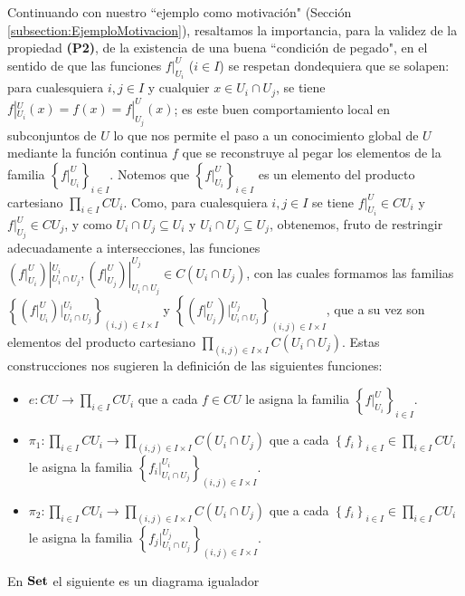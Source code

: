 Continuando con nuestro ``ejemplo como motivación" (Sección \ref{subsection:EjemploMotivacion}), resaltamos la importancia, para la validez de la propiedad \textbf{(P2)}, de la existencia de una buena ``condición de pegado", en el sentido de que las funciones $f|^{U}_{U_i}$ ($i\in I$) se respetan dondequiera que se solapen: para cualesquiera $i,j\in I$ y cualquier $x\in U_i\cap U_j$, se tiene $f|^U_{U_i}(x)=f(x)=f|^U_{U_j}(x)$; es este buen comportamiento local en subconjuntos de $U$ lo que nos permite el paso a un conocimiento global de $U$ mediante la función continua $f$ que se reconstruye al pegar los elementos de la familia $\left\lbrace f|^U_{U_i}\right\rbrace_{i\in I}$. Notemos que $\left\lbrace f|^U_{U_i}\right\rbrace_{i\in I}$ es un elemento del producto cartesiano $\prod_{i\in I} CU_i$. Como, para cualesquiera $i,j\in I$ se tiene $f|^U_{U_i}\in CU_i$ y $f|^U_{U_j}\in CU_j$, y como $U_i\cap U_j\subseteq U_i$ y $U_i\cap U_j\subseteq U_j$, obtenemos, fruto de restringir adecuadamente a intersecciones, las funciones $({f|^U_{U_i}})|^{U_i}_{U_i\cap U_j}, ({f|^U_{U_j}})|^{U_j}_{U_i\cap U_j}\in C(U_i\cap U_j)$, con las cuales formamos las familias $\left\lbrace ({f|^U_{U_i}})|^{U_i}_{U_i\cap U_j}\right\rbrace_{(i,j)\in I\times I}$ y $\left\lbrace ({f|^U_{U_j}})|^{U_j}_{U_i\cap U_j}\right\rbrace_{(i,j)\in I\times I}$, que a su vez son elementos del producto cartesiano $\prod_{(i,j)\in I\times I}C(U_i\cap U_j)$. Estas construcciones nos sugieren la definición de las siguientes funciones:
\begin{itemize}
   \item $e:CU\to \prod_{i\in I}CU_i$ que a cada $f\in CU$ le asigna la familia $\left\lbrace f|^{U}_{U_i}\right\rbrace_{i\in I}$.
   \item $\pi_1:\prod_{i\in I}CU_i\to \prod_{(i,j)\in I\times I}C(U_i\cap U_j)$ que a cada $\left\lbrace f_i\right\rbrace_{i\in I}\in\prod_{i\in I}CU_i$ le asigna la familia $\left\lbrace {f_i}|^{U_i}_{U_i\cap U_j}\right\rbrace_{(i,j)\in I\times I}$.
   \item $\pi_2:\prod_{i\in I}CU_i\to \prod_{(i,j)\in I\times I}C(U_i\cap U_j)$ que a cada $\left\lbrace f_i\right\rbrace_{i\in I}\in\prod_{i\in I}CU_i$ le asigna la familia $\left\lbrace {f_j}|^{U_j}_{U_i\cap U_j}\right\rbrace_{(i,j)\in I\times I}$.
\end{itemize}
\begin{Prop}\label{Prop:P2}
   En $\normalfont{\textbf{Set}}$ el siguiente es un diagrama igualador
   
\end{Prop}
